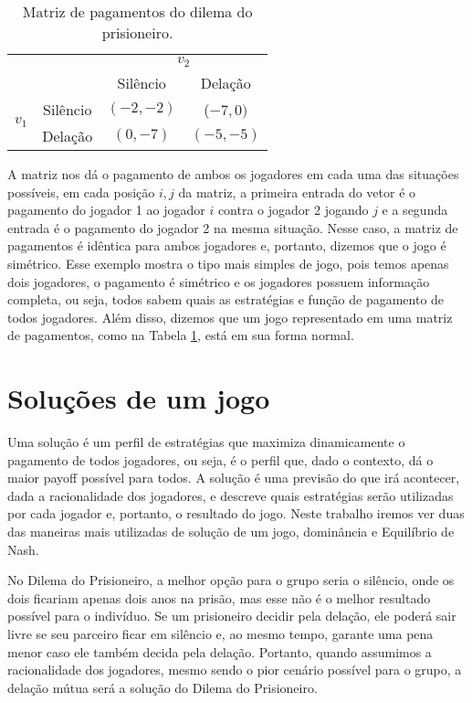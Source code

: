 \begin{table}[h]
\begin{center}
    \begin{tabular}{cccc}
        & & \multicolumn{2}{c}{$v_2$} \\
        & & Silêncio & Delação      \\ \cline{3-4} 
        \multirow{2}{*}{$v_1$} & \multicolumn{1}{c|}{Silêncio} & \multicolumn{1}{c|}{$(-2,-2)$} & \multicolumn{1}{c|}{($-7,0)$}  \\ \cline{3-4} 
        & \multicolumn{1}{c|}{Delação} & \multicolumn{1}{c|}{$(0,-7)$}  & \multicolumn{1}{c|}{$(-5,-5)$} \\ \cline{3-4} 
    \end{tabular}
    \caption{Matriz de pagamentos do dilema do prisioneiro.}
    \label{mpdp}
\end{center}
\end{table}


A matriz nos dá o pagamento de ambos os jogadores em cada uma das situações possíveis, em cada posição $i,j$ da matriz, a primeira entrada do vetor é o pagamento do jogador 1 ao jogador $i$ contra o jogador 2 jogando $j$ e a segunda entrada é o pagamento do jogador 2 na mesma situação. Nesse caso, a matriz de pagamentos é idêntica para ambos jogadores e, portanto, dizemos que o jogo é simétrico. Esse exemplo mostra o tipo mais simples de jogo, pois temos apenas dois jogadores, o pagamento é simétrico e os jogadores possuem informação completa, ou seja, todos sabem quais as estratégias e função de pagamento de todos jogadores. Além disso, dizemos que um jogo representado em uma matriz de pagamentos, como na Tabela \ref{mpdp}, está em sua forma normal.


\section{Soluções de um jogo}

Uma solução é um perfil de estratégias que maximiza dinamicamente o pagamento de todos jogadores, ou seja, é o perfil que, dado o contexto, dá o maior payoff possível para todos. A solução é uma previsão do que irá acontecer, dada a racionalidade dos jogadores, e descreve quais estratégias serão utilizadas por cada jogador e, portanto, o resultado do jogo. Neste trabalho iremos ver duas das maneiras mais utilizadas de solução de um jogo, dominância e Equilíbrio de Nash.

No Dilema do Prisioneiro, a melhor opção para o grupo seria o silêncio, onde os dois ficariam apenas dois anos na prisão, mas esse não é o melhor resultado possível para o indivíduo. Se um prisioneiro decidir pela delação, ele poderá sair livre se seu parceiro ficar em silêncio e, ao mesmo tempo, garante uma pena menor caso ele também decida pela delação. Portanto, quando assumimos a racionalidade dos jogadores, mesmo sendo o pior cenário possível para o grupo, a delação mútua será a solução do Dilema do Prisioneiro.

